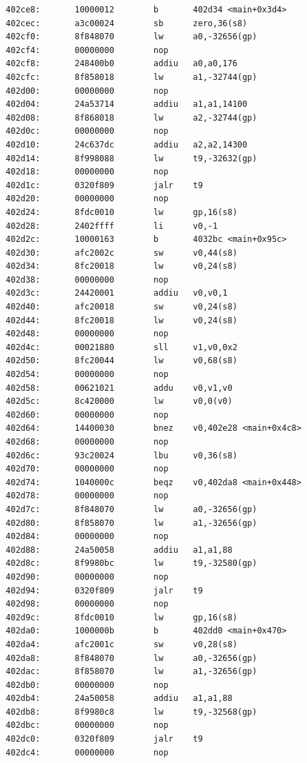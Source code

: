 \documentclass[11pt]{article}
\begin{document}
\begin{verbatim}
  402ce8:       10000012        b       402d34 <main+0x3d4>
  402cec:       a3c00024        sb      zero,36(s8)
  402cf0:       8f848070        lw      a0,-32656(gp)
  402cf4:       00000000        nop
  402cf8:       248400b0        addiu   a0,a0,176
  402cfc:       8f858018        lw      a1,-32744(gp)
  402d00:       00000000        nop
  402d04:       24a53714        addiu   a1,a1,14100
  402d08:       8f868018        lw      a2,-32744(gp)
  402d0c:       00000000        nop
  402d10:       24c637dc        addiu   a2,a2,14300
  402d14:       8f998088        lw      t9,-32632(gp)
  402d18:       00000000        nop
  402d1c:       0320f809        jalr    t9
  402d20:       00000000        nop
  402d24:       8fdc0010        lw      gp,16(s8)
  402d28:       2402ffff        li      v0,-1
  402d2c:       10000163        b       4032bc <main+0x95c>
  402d30:       afc2002c        sw      v0,44(s8)
  402d34:       8fc20018        lw      v0,24(s8)
  402d38:       00000000        nop
  402d3c:       24420001        addiu   v0,v0,1
  402d40:       afc20018        sw      v0,24(s8)
  402d44:       8fc20018        lw      v0,24(s8)
  402d48:       00000000        nop
  402d4c:       00021880        sll     v1,v0,0x2
  402d50:       8fc20044        lw      v0,68(s8)
  402d54:       00000000        nop
  402d58:       00621021        addu    v0,v1,v0
  402d5c:       8c420000        lw      v0,0(v0)
  402d60:       00000000        nop
  402d64:       14400030        bnez    v0,402e28 <main+0x4c8>
  402d68:       00000000        nop
  402d6c:       93c20024        lbu     v0,36(s8)
  402d70:       00000000        nop
  402d74:       1040000c        beqz    v0,402da8 <main+0x448>
  402d78:       00000000        nop
  402d7c:       8f848070        lw      a0,-32656(gp)
  402d80:       8f858070        lw      a1,-32656(gp)
  402d84:       00000000        nop
  402d88:       24a50058        addiu   a1,a1,88
  402d8c:       8f9980bc        lw      t9,-32580(gp)
  402d90:       00000000        nop
  402d94:       0320f809        jalr    t9
  402d98:       00000000        nop
  402d9c:       8fdc0010        lw      gp,16(s8)
  402da0:       1000000b        b       402dd0 <main+0x470>
  402da4:       afc2001c        sw      v0,28(s8)
  402da8:       8f848070        lw      a0,-32656(gp)
  402dac:       8f858070        lw      a1,-32656(gp)
  402db0:       00000000        nop
  402db4:       24a50058        addiu   a1,a1,88
  402db8:       8f9980c8        lw      t9,-32568(gp)
  402dbc:       00000000        nop
  402dc0:       0320f809        jalr    t9
  402dc4:       00000000        nop

\end{verbatim}
\end{document}
